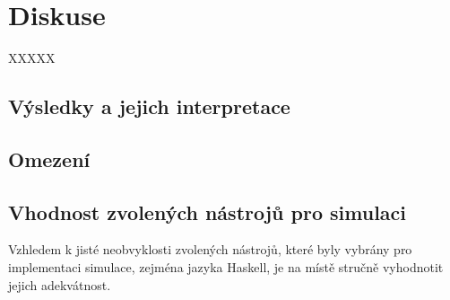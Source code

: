 \chapter{Diskuse}

%
%
%
%
%

XXXXX


\section{Výsledky a jejich interpretace}

\section{Omezení}

\section{Vhodnost zvolených nástrojů pro simulaci}

Vzhledem k jisté neobvyklosti zvolených nástrojů, které byly vybrány pro implementaci simulace, zejména jazyka Haskell, je na místě stručně
vyhodnotit jejich adekvátnost.

